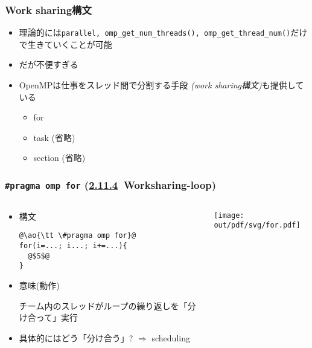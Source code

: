 \documentclass[10pt,dvipdfmx]{beamer}
\newcommand{\sectionompfor}{\href{https://www.openmp.org/spec-html/5.1/openmpsu48.html}{2.11.4}}
\newcommand{\ao}[1]{{\color{blue}#1}}
\begin{document}

\begin{frame}[fragile]
\frametitle{Work sharing構文}
\begin{itemize}
\item 理論的には\ao{\tt parallel, omp\_get\_num\_threads(),
    omp\_get\_thread\_num()}だけで生きていくことが可能
\item だが不便すぎる
\item OpenMPは仕事をスレッド間で\ao{分割}する手段
  \ao{\em (work sharing構文)}も提供している
  \begin{itemize}
  \item \ao{for}
  \item task (省略)
  \item section (省略)
  \end{itemize}
\end{itemize}
\end{frame}

\begin{frame}[fragile]
\frametitle{{\tt \#pragma omp for} (\sectionompfor \ Worksharing-loop)}
\begin{columns}

\begin{column}{0.5\textwidth}
\begin{itemize}
\item 構文
\begin{lstlisting}
@\ao{\tt \#pragma omp for}@
for(i=...; i...; i+=...){
  @$S$@
}
\end{lstlisting}

\item 意味(動作)

チーム内のスレッドがループの繰り返しを「分け合って」実行

\item 具体的にはどう「分け合う」? $\Rightarrow$ scheduling

\end{itemize}
\end{column}

\begin{column}{0.5\textwidth}
\texttt{[image: out/pdf/svg/for.pdf]}
\end{column}
\end{columns}
\end{frame}
\end{document}
